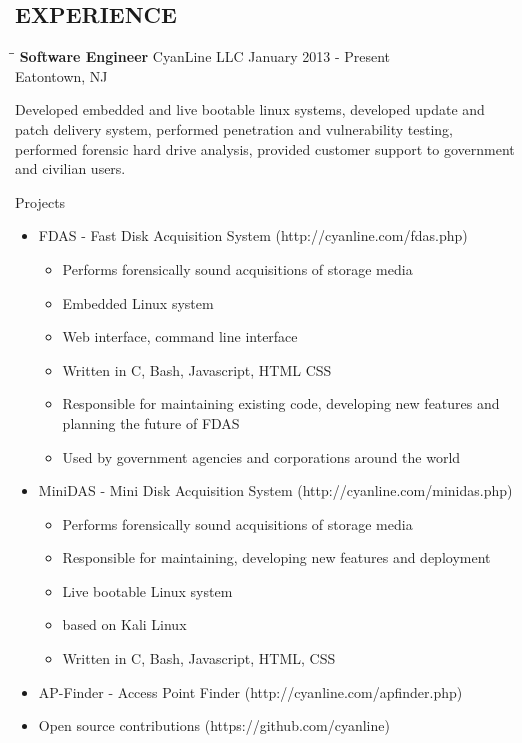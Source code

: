 \documentclass{res}
\begin{document}
\begin{resume}
\section{EXPERIENCE}
   \vspace{-0.1in}	
   \begin{tabbing}
   \hspace{2.3in}\= \hspace{2.6in}\= \kill %
    {\bf Software Engineer} \>CyanLine LLC     \>January 2013 - Present\\
                             \>Eatontown, NJ
   \end{tabbing}\vspace{-20pt}      %
    Developed embedded and live bootable linux systems, 
    developed update and patch delivery system,
    performed penetration and vulnerability testing,
    performed forensic hard drive analysis,
    provided customer support to government and civilian users.

    Projects
    \begin{itemize}
        \item FDAS - Fast Disk Acquisition System (http://cyanline.com/fdas.php)
        \begin{itemize}
            \item Performs forensically sound acquisitions of storage media
            \item Embedded Linux system
            \item Web interface, command line interface
            \item Written in C, Bash, Javascript, HTML CSS
            \item Responsible for maintaining existing code, developing new features and planning the future of FDAS
            \item Used by government agencies and corporations around the world
        \end{itemize}
        \item MiniDAS - Mini Disk Acquisition System (http://cyanline.com/minidas.php)
        \begin{itemize}
            \item Performs forensically sound acquisitions of storage media
            \item Responsible for maintaining, developing new features and deployment
            \item Live bootable Linux system
            \item based on Kali Linux
            \item Written in C, Bash, Javascript, HTML, CSS
        \end{itemize}
        \item AP-Finder - Access Point Finder (http://cyanline.com/apfinder.php)
        \item Open source contributions (https://github.com/cyanline)
    \end{itemize}


\end{resume}
\end{document}

